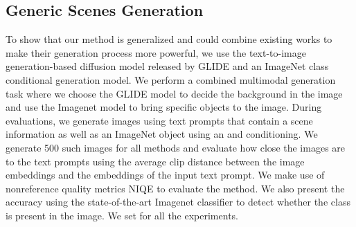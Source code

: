 \documentclass[10pt,twocolumn,letterpaper]{article}
\begin{document}
\subsection{Generic Scenes Generation}
\label{sec:generic}
To show that our method is generalized and could combine existing works to make their generation process more powerful, we use the text-to-image generation-based diffusion model released by GLIDE and an ImageNet class conditional generation model. We perform a combined multimodal generation task where we choose the GLIDE model to decide the background in the image and use the Imagenet model to bring specific objects to the image. During evaluations, we generate images using text prompts that contain a scene information as well as an ImageNet object using an and conditioning. We generate 500 such images for all methods and evaluate how close the images are to the text prompts using the average clip distance between the image embeddings and the embeddings of the input text prompt. We make use of nonreference quality metrics NIQE to evaluate the method. We also present the accuracy using the state-of-the-art Imagenet classifier\cite{tan2019efficientnet} to detect whether the class is present in the image. We set   for all the experiments. 
\end{document}

